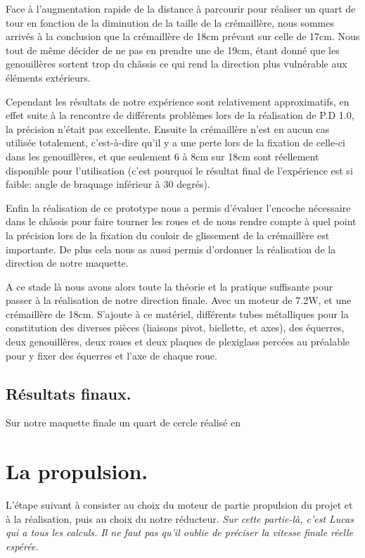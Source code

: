 Face à l’augmentation rapide de la distance à parcourir pour réaliser un quart de tour en fonction de la diminution de la taille de la crémaillère, nous sommes arrivés à la conclusion que la crémaillère de 18cm prévaut sur celle de 17cm. Nous tout de même décider de ne pas en prendre une de 19cm, étant donné que les genouillères sortent trop du châssis ce qui rend la direction plus vulnérable aux éléments extérieurs.

Cependant les résultats de notre expérience sont relativement approximatifs, en effet suite à la rencontre de différents problèmes lors de la réalisation de P.D 1.0, la précision n’était pas excellente. Ensuite la crémaillère n’est en aucun cas utilisée totalement, c’est-à-dire qu’il y a une perte lors de la fixation de celle-ci dans les genouillères, et que seulement 6 à 8cm sur 18cm sont réellement disponible pour l’utilisation (c’est pourquoi le résultat final de l’expérience est si faible: angle de braquage inférieur à 30 degrés).

Enfin la réalisation de ce prototype nous a permis d’évaluer l’encoche nécessaire dans le châssis pour faire tourner les roues et de nous rendre compte à quel point la précision lors de la fixation du couloir de glissement de la crémaillère est importante. De plus cela nous as aussi permis d’ordonner la réalisation de la direction de notre maquette.

A ce stade là nous avons alors toute la théorie et la pratique suffisante pour passer à la réalisation de notre direction finale. Avec un moteur de 7.2W, et une crémaillère de 18cm. S’ajoute à ce matériel, différents tubes métalliques pour la constitution des diverses pièces (liaisons pivot, biellette, et axes), des équerres, deux genouillères, deux roues et deux plaques de plexiglass percées au préalable pour y fixer des équerres et l’axe de chaque roue.  

\section{Résultats finaux.}
Sur notre maquette finale un quart de cercle réalisé en 

\chapter{La propulsion.}
L’étape suivant à consister au choix du moteur de partie propulsion du projet et à la réalisation, puis au choix du notre réducteur. \emph{Sur cette partie-là, c’est Lucas qui a tous les calculs. Il ne faut pas qu’il oublie de préciser la vitesse finale réelle espérée.}

